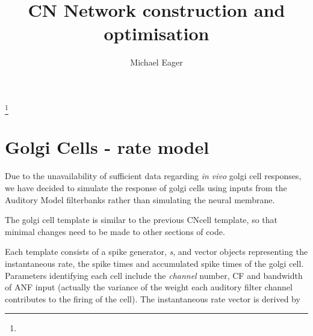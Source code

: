 \documentclass{amsart}
\theoremstyle{definition}
\theoremstyle{remark}
\numberwithin{equation}{section}
\begin{document}
\title[]{CN Network construction and optimisation}%
\author{Michael Eager}%
\address{}%
%

\thanks{}%
\subjclass{}%
\keywords{}%


\maketitle
\section{Golgi Cells - rate model}

Due to the unavailability of sufficient data regarding \emph{in vivo} golgi cell
responses, we have decided to simulate the response of golgi cells using inputs
from the Auditory Model filterbanks rather than simulating the neural membrane.

The golgi cell template is similar to the previous CNcell template, so that
minimal changes need to be made to other sections of code. 

Each template consists of a spike generator, \emph{s}, and vector objects
representing the instantaneous rate, the spike times and accumulated  spike
times of the golgi cell. Parameters identifying each cell include the
\emph{channel} number, CF and bandwidth of ANF input (actually the variance of
the weight each auditory filter channel contributes to the firing of the cell).
The instantaneous rate vector is derived by 
\end{document}
